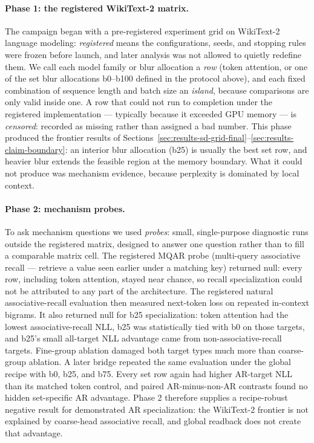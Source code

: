 \documentclass{article}
\theoremstyle{plain}
\theoremstyle{definition}
\theoremstyle{remark}
\begin{document}
\paragraph{Phase 1: the registered WikiText-2 matrix.}  The campaign began
with a pre-registered experiment grid on WikiText-2 language modeling:
\emph{registered} means the configurations, seeds, and stopping rules were
frozen before launch, and later analysis was not allowed to quietly redefine
them.  We call each model family or blur allocation a \emph{row} (token
attention, or one of
the set blur allocations b0--b100 defined in the protocol above), and each
fixed combination of sequence length and batch size an \emph{island},
because comparisons are only valid inside one.  A row that could not run to
completion under the registered implementation --- typically because it
exceeded GPU memory --- is \emph{censored}: recorded as missing rather than
assigned a bad number.  This phase produced the frontier results of
Sections~\ref{sec:results-sd-grid-final}--\ref{sec:results-claim-boundary}:
an interior blur allocation (b25) is usually the best set row, and heavier
blur extends the feasible region at the memory boundary.  What it could not
produce was mechanism evidence, because perplexity is dominated by local
context.

\paragraph{Phase 2: mechanism probes.}  To ask mechanism questions we used
\emph{probes}: small, single-purpose diagnostic runs outside the registered
matrix, designed to answer one question rather than to fill a comparable
matrix cell.  The registered MQAR probe (multi-query associative recall ---
retrieve a value seen earlier under a matching key) returned null: every row,
including token attention, stayed near chance, so recall specialization
could not be attributed to any part of the architecture.  The registered
natural associative-recall evaluation then measured next-token loss on
repeated in-context bigrams.  It also returned null for b25 specialization:
token attention had the lowest associative-recall NLL, b25 was statistically
tied with b0 on those targets, and b25's small all-target NLL advantage came
from non-associative-recall targets.  Fine-group ablation damaged both target
types much more than coarse-group ablation.  A later bridge repeated the same
evaluation under the global recipe with b0, b25, and b75.  Every set row again
had higher AR-target NLL than its matched token control, and paired
AR-minus-non-AR contrasts found no hidden set-specific AR advantage.  Phase 2
therefore supplies a recipe-robust negative result for demonstrated AR
specialization: the WikiText-2 frontier is not explained by coarse-head
associative recall, and global readback does not create that advantage.
\end{document}
